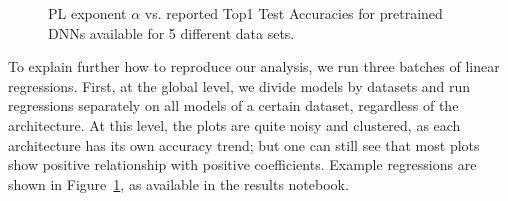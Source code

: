 \begin{figure}[t]
    \centering
    \qquad
    \qquad
    \qquad
    \qquad
    \caption{ PL exponent $\alpha$ vs. reported Top1 Test Accuracies for pretrained DNNs available for 5 different data sets.}
    \label{fig:DSalphas}
\end{figure}

To explain further how to reproduce our analysis, we run three batches of linear regressions. 
First, at the global level, we divide models by datasets and run regressions separately on all models of a certain dataset, regardless of the architecture. 
At this level, the plots are quite noisy and clustered, as each architecture has its own accuracy trend; but one can still see that most plots show positive relationship with positive coefficients. 
Example regressions are shown in Figure~\ref{fig:DSalphas}, as available in the results notebook.
 
